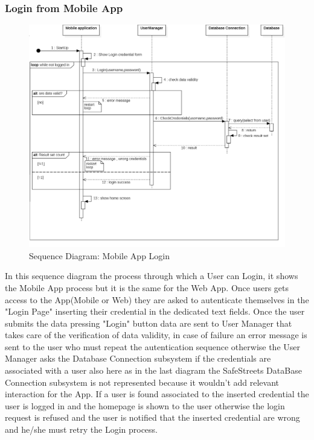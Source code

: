 \subsubsection{Login from Mobile App}
\begin{figure}[H]
\centering
\includegraphics[width=\textwidth]{Images/SequenceLogin.png}
\caption{\label{fig:ComWI}Sequence Diagram: Mobile App Login}
\end{figure}
In this sequence diagram the process through which a User can Login, it shows the Mobile App process but it is the same for the Web App.
Once users gets access to the App(Mobile or Web) they are asked to autenticate themselves in the "Login Page" inserting their credential in the dedicated text fields. Once the user submits the data pressing "Login" button data are sent to User Manager that takes care of the verification of data validity, in case of failure an error message is sent to the user who must repeat the autentication sequence otherwise the User Manager asks the Database Connection subsystem if the credentials are associated with a user also here as in the last diagram the SafeStreets DataBase Connection subsystem is not represented because it wouldn't add relevant interaction for the App. If a  user is found associated to the inserted credential the user is logged in and the homepage is shown to the user otherwise the login request is refused  and the user is notified that the inserted credential are wrong and he/she must retry the Login process.
